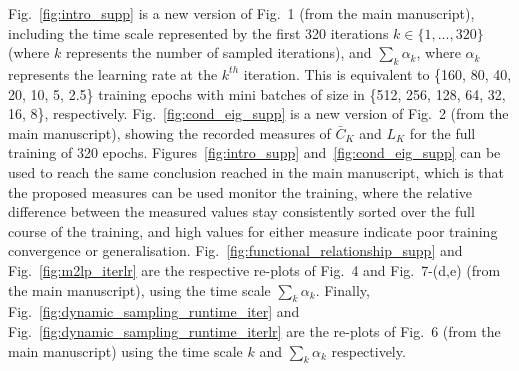 \documentclass[10pt,journal,compsoc]{IEEEtran}
\begin{document}
Fig.~\ref{fig:intro_supp} is a new version of Fig.~1 (from the main manuscript), including the time scale represented by the first 320 iterations $k \in \{1,...,320\}$ (where $k$ represents the number of sampled iterations),
and $\sum_k \alpha_k$, where $\alpha_k$ represents the learning rate at the $k^{th}$ iteration.
This is equivalent to \{160, 80, 40, 20, 10, 5, 2.5\} training epochs with mini batches of size in \{512, 256, 128, 64, 32, 16, 8\}, respectively.
Fig.~\ref{fig:cond_eig_supp} is a new version of Fig.~2 (from the main manuscript), showing the recorded measures of $\bar C_K$ and $L_K$ for the full training of 320 epochs.
Figures~\ref{fig:intro_supp} and~\ref{fig:cond_eig_supp} can be used to reach the same conclusion reached in the main manuscript, which is that the proposed measures can be used monitor the training, where the relative difference between the measured values stay consistently sorted over the full course of the training, and high values for either measure indicate poor training convergence or generalisation.
Fig.~\ref{fig:functional_relationship_supp} and Fig.~\ref{fig:m2lp_iterlr} are the respective re-plots of Fig.~4 and Fig.~7-(d,e) (from the main manuscript), using the time scale $\sum_k \alpha_k$.
Finally, Fig.~\ref{fig:dynamic_sampling_runtime_iter} and Fig.~\ref{fig:dynamic_sampling_runtime_iterlr} are the re-plots of Fig.~6 (from the main manuscript) using the time scale $k$ and $\sum_k \alpha_k$ respectively.







\begin{figure*}
\begin{center}
\end{center}
\caption{The re-plot of Fig.~1-(c) from the main manuscript, showing $\bar C_k$ (a,c) and $L_k$ (b,d) as a function of $k$ in (a,b), and $\sum_k \alpha_k$ in (c,d).}
\label{fig:intro_supp}
\end{figure*}
\end{document}
